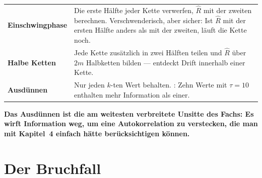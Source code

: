 \begin{merksatz}
\begin{center}
{\small
\renewcommand{\arraystretch}{1.5}
\begin{tabular}{@{}P{3.0cm}P{5.6cm}@{}}
\toprule
\textbf{Einschwingphase} & Die erste Hälfte jeder Kette verwerfen, $\hat R$ mit der zweiten berechnen. Verschwenderisch, aber sicher: Ist $\hat R$ mit der ersten Hälfte anders als mit der zweiten, läuft die Kette noch.\\
\textbf{Halbe Ketten} & Jede Kette zusätzlich in zwei Hälften teilen und $\hat R$ über $2m$ Halbketten bilden --- entdeckt Drift innerhalb einer Kette.\\
\textbf{Ausdünnen} & Nur jeden $k$-ten Wert behalten. : Zehn Werte mit $\tau=10$ enthalten mehr Information als einer.\\
\bottomrule
\end{tabular}}
\end{center}

\begin{center}
\begin{minipage}{0.9\textwidth}
\textbf{Das Ausdünnen ist die am weitesten verbreitete Unsitte des Fachs: Es wirft Information weg, um eine Autokorrelation zu verstecken, die man mit Kapitel~4 einfach hätte berücksichtigen können.}
\end{minipage}
\end{center}

\begin{center}
\begin{minipage}{0.88\textwidth}
\end{minipage}
\end{center}
\end{merksatz}

\section{Der Bruchfall}

